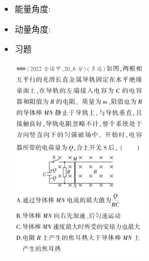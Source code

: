\documentclass{article}
\begin{document}
\vspace{2em}

\begin{itemize}
    \item 能量角度:
          \vspace{5em}
    \item 动量角度:
          \vspace{5em}
    \item 习题

          \centering
          \includegraphics[width=0.45\textwidth]{pictures/20.png}
\end{itemize}
\end{document}
